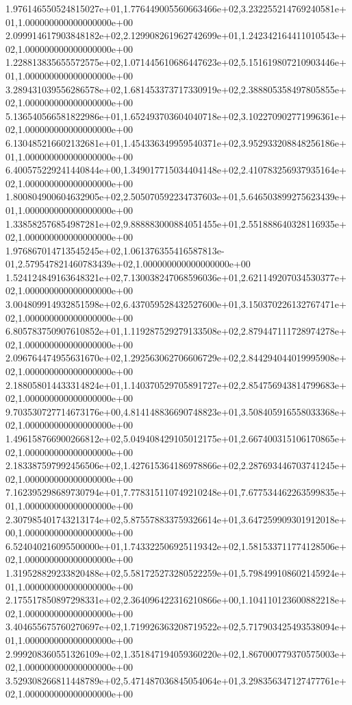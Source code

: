 1.976146550524815027e+01,1.776449005560663466e+02,3.232255214769240581e+01,1.000000000000000000e+00
2.099914617903848182e+02,2.129908261962742699e+01,1.242342164411010543e+02,1.000000000000000000e+00
1.228813835655572575e+02,1.071445610686447623e+02,5.151619807210903446e+01,1.000000000000000000e+00
3.289431039556286578e+02,1.681453373717330919e+02,2.388805358497805855e+02,1.000000000000000000e+00
5.136540566581822986e+01,1.652493703604040718e+02,3.102270902771996361e+02,1.000000000000000000e+00
6.130485216602132681e+01,1.454336349959540371e+02,3.952933208848256186e+01,1.000000000000000000e+00
6.400575229241440844e+00,1.349017715034404148e+02,2.410783256937935164e+02,1.000000000000000000e+00
1.800804900604632905e+02,2.505070592234737603e+01,5.646503899275623439e+01,1.000000000000000000e+00
1.338582576854987281e+02,9.888883000884051455e+01,2.551888640328116935e+02,1.000000000000000000e+00
1.976867014713545245e+02,1.061376355416587813e-01,2.579547821460783439e+02,1.000000000000000000e+00
1.524124849163648321e+02,7.130038247068596036e+01,2.621149207034530377e+02,1.000000000000000000e+00
3.004809914932851598e+02,6.437059528432527600e+01,3.150370226132767471e+02,1.000000000000000000e+00
6.805783750907610852e+01,1.119287529279133508e+02,2.879447111728974278e+02,1.000000000000000000e+00
2.096764474955631670e+02,1.292563062706606729e+02,2.844294044019995908e+02,1.000000000000000000e+00
2.188058014433314824e+01,1.140370529705891727e+02,2.854756943814799683e+02,1.000000000000000000e+00
9.703530727714673176e+00,4.814148836690748823e+01,3.508405916558033368e+02,1.000000000000000000e+00
1.496158766900266812e+02,5.049408429105012175e+01,2.667400315106170865e+02,1.000000000000000000e+00
2.183387597992456506e+02,1.427615364186978866e+02,2.287693446703741245e+02,1.000000000000000000e+00
7.162395298689730794e+01,7.778315110749210248e+01,7.677534462263599835e+01,1.000000000000000000e+00
2.307985401743213174e+02,5.875578833759326614e+01,3.647259909301912018e+00,1.000000000000000000e+00
6.524040216095500000e+01,1.743322506925119342e+02,1.581533711774128506e+02,1.000000000000000000e+00
1.319528829233820488e+02,5.581725273280522259e+01,5.798499108602145924e+01,1.000000000000000000e+00
2.175517850897298331e+02,2.364096422316210866e+00,1.104110123600882218e+02,1.000000000000000000e+00
3.404655675760270697e+02,1.719926363208719522e+02,5.717903425493538094e+01,1.000000000000000000e+00
2.999208360551326109e+02,1.351847194059360220e+02,1.867000779370575003e+02,1.000000000000000000e+00
3.529308266811448789e+02,5.471487036845054064e+01,3.298356347127477761e+02,1.000000000000000000e+00
